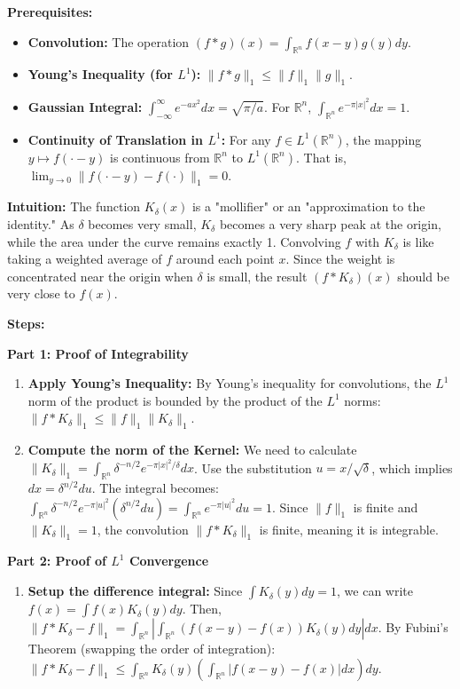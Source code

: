 \begin{solution}
\textbf{Prerequisites:}
\begin{itemize}
    \item \textbf{Convolution:} The operation $(f * g)(x) = \int_{\mathbb{R}^n} f(x-y)g(y) dy$.
    \item \textbf{Young's Inequality (for $L^1$):} $\|f * g\|_1 \leq \|f\|_1 \|g\|_1$.
    \item \textbf{Gaussian Integral:} $\int_{-\infty}^\infty e^{-ax^2} dx = \sqrt{\pi/a}$. For $\mathbb{R}^n$, $\int_{\mathbb{R}^n} e^{-\pi |x|^2} dx = 1$.
    \item \textbf{Continuity of Translation in $L^1$:} For any $f \in L^1(\mathbb{R}^n)$, the mapping $y \mapsto f(\cdot - y)$ is continuous from $\mathbb{R}^n$ to $L^1(\mathbb{R}^n)$. That is, $\lim_{y \to 0} \|f(\cdot - y) - f(\cdot)\|_1 = 0$.
\end{itemize}

\textbf{Intuition:}
The function $K_\delta(x)$ is a "mollifier" or an "approximation to the identity." As $\delta$ becomes very small, $K_\delta$ becomes a very sharp peak at the origin, while the area under the curve remains exactly 1. Convolving $f$ with $K_\delta$ is like taking a weighted average of $f$ around each point $x$. Since the weight is concentrated near the origin when $\delta$ is small, the result $(f * K_\delta)(x)$ should be very close to $f(x)$.

\textbf{Steps:}

\textbf{Part 1: Proof of Integrability}
\begin{enumerate}
    \item \textbf{Apply Young's Inequality:}
    By Young's inequality for convolutions, the $L^1$ norm of the product is bounded by the product of the $L^1$ norms:
    $\|f * K_\delta\|_1 \leq \|f\|_1 \|K_\delta\|_1$.

    \item \textbf{Compute the norm of the Kernel:}
    We need to calculate $\|K_\delta\|_1 = \int_{\mathbb{R}^n} \delta^{-n/2} e^{-\pi |x|^2 / \delta} dx$.
    Use the substitution $u = x / \sqrt{\delta}$, which implies $dx = \delta^{n/2} du$.
    The integral becomes:
    $\int_{\mathbb{R}^n} \delta^{-n/2} e^{-\pi |u|^2} (\delta^{n/2} du) = \int_{\mathbb{R}^n} e^{-\pi |u|^2} du = 1$.
    Since $\|f\|_1$ is finite and $\|K_\delta\|_1 = 1$, the convolution $\|f * K_\delta\|_1$ is finite, meaning it is integrable.
\end{enumerate}

\textbf{Part 2: Proof of $L^1$ Convergence}
\begin{enumerate}
    \item \textbf{Setup the difference integral:}
    Since $\int K_\delta(y) dy = 1$, we can write $f(x) = \int f(x) K_\delta(y) dy$.
    Then, $\|f * K_\delta - f\|_1 = \int_{\mathbb{R}^n} | \int_{\mathbb{R}^n} (f(x-y) - f(x)) K_\delta(y) dy | dx$.
    By Fubini's Theorem (swapping the order of integration):
    $\|f * K_\delta - f\|_1 \leq \int_{\mathbb{R}^n} K_\delta(y) \left( \int_{\mathbb{R}^n} |f(x-y) - f(x)| dx \right) dy$.


\end{enumerate}
\end{solution}
